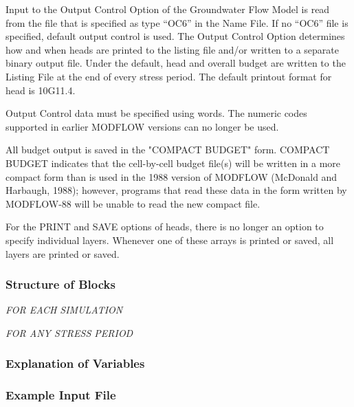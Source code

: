 Input to the Output Control Option of the Groundwater Flow Model is read from the file that is specified as type ``OC6'' in the Name File. If no ``OC6'' file is specified, default output control is used. The Output Control Option determines how and when heads are printed to the listing file and/or written to a separate binary output file.  Under the default, head and overall budget are written to the Listing File at the end of every stress period. The default printout format for head is 10G11.4.

Output Control data must be specified using words.  The numeric codes supported in earlier MODFLOW versions can no longer be used.

All budget output is saved in the "COMPACT BUDGET" form.  COMPACT BUDGET indicates that the cell-by-cell budget file(s) will be written in a more compact form than is used in the 1988 version of MODFLOW (McDonald and Harbaugh, 1988); however, programs that read these data in the form written by MODFLOW-88 will be unable to read the new compact file.

For the PRINT and SAVE options of heads, there is no longer an option to specify individual layers.  Whenever one of these arrays is printed or saved, all layers are printed or saved.

\vspace{5mm}
\subsubsection{Structure of Blocks}
\vspace{5mm}

\noindent \textit{FOR EACH SIMULATION}

\vspace{5mm}
\noindent \textit{FOR ANY STRESS PERIOD}


\vspace{5mm}
\subsubsection{Explanation of Variables}
\begin{description}

\end{description}

\vspace{5mm}
\subsubsection{Example Input File}

